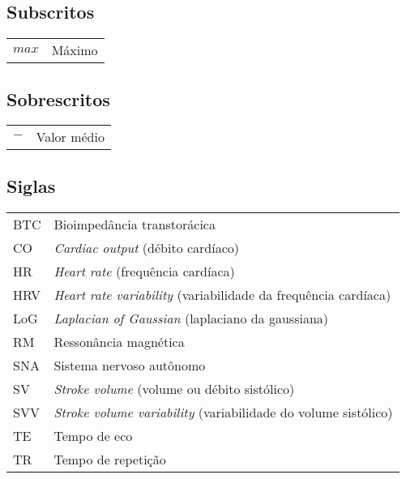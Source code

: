 \subsection*{Subscritos}

\begin{tabular}{p{}p{}}
$max$	& Máximo \\

\end{tabular}

\subsection*{Sobrescritos}

\begin{tabular}{p{}p{}}
$-$	& Valor médio
\end{tabular}

\subsection*{Siglas}

\begin{tabular}{p{}p{}}

BTC & Bioimpedância transtorácica\\
CO & \textit{Cardiac output} (débito cardíaco)\\
HR & \textit{Heart rate} (frequência cardíaca)\\
HRV & \textit{Heart rate variability} (variabilidade da frequência cardíaca)\\
LoG	& \textit{Laplacian of Gaussian} (laplaciano da gaussiana)\\
RM & Ressonância magnética\\
SNA & Sistema nervoso autônomo\\
SV & \textit{Stroke volume} (volume ou débito sistólico)\\
SVV & \textit{Stroke volume variability} (variabilidade do volume sistólico)\\
TE & Tempo de eco\\
TR & Tempo de repetição


\end{tabular}

